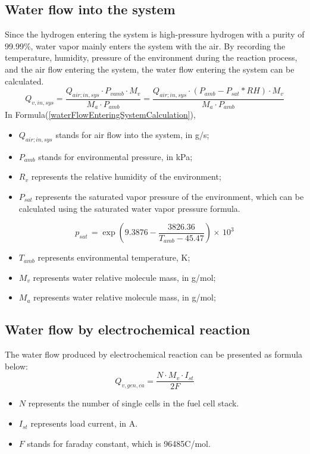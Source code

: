 \subsection*{Water flow into the system}
Since the hydrogen entering the system is high-pressure hydrogen with a purity of 99.99\%, water vapor mainly enters the system with the air. By recording the temperature, humidity, pressure of the environment during the reaction process, and the air flow entering the system, the water flow entering the system can be calculated.
\begin{equation}\label{waterFlowEnteringSystemCalculation}
	Q_{v,i n,s y s}={\frac{Q_{a i r;i n,s y s}\cdot P_{v a m b} \cdot M_{v}}{M_{a} \cdot P_{a m b}}}={\frac{Q_{a i r;i n,s y s}\cdot (P_{a m b} - P_{s a t} \ast RH)\cdot M_{v}}{M_{a} \cdot P_{a m b}}}
\end{equation}
In Formula(\ref{waterFlowEnteringSystemCalculation}),
\begin{itemize}
	\item $Q_{a i r;i n,s y s}$ stands for air flow into the system, in g/s;
	\item $P_{a m b}$ stands for environmental pressure, in kPa;
	\item $R_{v}$ represents the relative humidity of the environment;
	\item $P_{sat}$ represents the saturated vapor pressure of the environment, which can be calculated using the saturated water vapor pressure formula.
\end{itemize}

\begin{equation}
	p_{sat}\,= \exp \left(9.3876-{\frac{3826.36}{T_{a m b}-45.47}}\right)\times\,10^{3}
\end{equation}
\begin{itemize}
	\item $T_{amb}$ represents environmental temperature, K;
	\item $M_{v}$ represents water relative molecule mass, in g/mol;
	\item $M_{a}$ represents water relative molecule mass, in g/mol;
\end{itemize}
\subsection*{Water flow by electrochemical reaction}
The water flow produced by electrochemical reaction can be presented as formula below:
\begin{equation}
	Q_{v,g e n,c a}=\frac{{N\cdot M_{v}\cdot I_{s t}}}{2F}
\end{equation}
\begin{itemize}
	\item $N$ represents the number of single cells in the fuel cell stack.
	\item $I_{st}$ represents load current, in A.
	\item $F$ stands for faraday constant, which is 96485C/mol.
\end{itemize}
